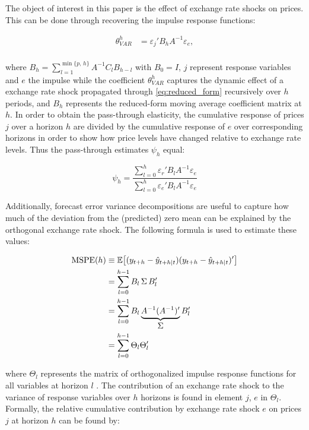 \documentclass[12pt]{article}
\begin{document}
The object of interest in this paper is the effect of exchange rate shocks on prices. This can be done through recovering the impulse response functions:

\begin{align}  \label{eq:irf}
    \theta_{VAR}^h &= {\varepsilon_{j}}' B_h A^{-1} \varepsilon_e,  \\
    \end{align}

    where $B_h = \sum_{l=1}^{\min\{p,\,h\}} A^{-1}C_l B_{h-l}$ with $B_0 = I$, $j$ represent response variables and $e$ the impulse while the coefficient $\theta_{VAR}^h$ captures the dynamic effect of a exchange rate shock propagated through \eqref{eq:reduced_form} recursively over $h$ periods, and $B_h$ represents the reduced-form moving average coefficient matrix at $h$. In order to obtain the pass-through elasticity, the cumulative response of prices $j$ over a horizon $h$ are divided by the cumulative response of $e$ over corresponding horizons in order to show how price levels have changed relative to exchange rate levels. Thus the pass-through estimates $\psi_h$ equal:

\begin{equation} \label{eq:pt_elasticity}
\psi_h = \frac{\sum_{l=0}^{h} \varepsilon_r' B_l A^{-1} \varepsilon_e}{\sum_{l=0}^{h} \varepsilon_e' B_l A^{-1} \varepsilon_e}
\end{equation}


Additionally, forecast error variance decompositions are useful to capture how much of the deviation from the (predicted) zero mean can be explained by the orthogonal exchange rate shock. The following formula is used to estimate these values:

\begin{align} \label{eq:fevd}
    \text{MSPE}(h) &\equiv \mathbb{E}\!\left[(y_{t+h} - \hat{y}_{t+h|t})                                  (y_{t+h} - \hat{y}_{t+h|t})'\right] \notag \\ &= \sum_{l=0}^{h-1} B_l \, \Sigma \, B_l' \notag \\ &= \sum_{l=0}^{h-1} B_l \underbrace{A^{-1}(A^{-1})'}_{\displaystyle\Sigma} B_l' \notag \\   &= \sum_{l=0}^{h-1} \Theta_l \Theta_l'
\end{align}
	
 where $\Theta_l$ represents the matrix of orthogonalized impulse response functions for all variables at horizon $l$ \parencite{Kilian_Lütkepohl_ch4}. The contribution of an exchange rate shock to the variance of response variables over $h$ horizons is found in element $j$, $e$ in  $\Theta_l$. Formally, the relative cumulative contribution by exchange rate shock $e$ on prices $j$ at horizon $h$ can be found by:
 
\end{document}
